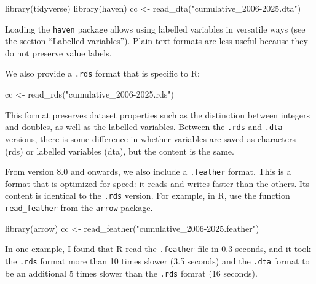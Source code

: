 \documentclass[10pt,article,oneside]{memoir}
\newenvironment{Shaded}{\begin{snugshade}}{\end{snugshade}}
\newcommand{\FunctionTok}[1]{\textcolor[rgb]{0.28,0.35,0.67}{#1}}
\newcommand{\NormalTok}[1]{\textcolor[rgb]{0.00,0.23,0.31}{#1}}
\newcommand{\OtherTok}[1]{\textcolor[rgb]{0.00,0.23,0.31}{#1}}
\newcommand{\StringTok}[1]{\textcolor[rgb]{0.13,0.47,0.30}{#1}}
\begin{document}
\begin{Shaded}
\begin{Highlighting}[]
\FunctionTok{library}\NormalTok{(tidyverse)}
\FunctionTok{library}\NormalTok{(haven)}
\NormalTok{cc }\OtherTok{\textless{}{-}} \FunctionTok{read\_dta}\NormalTok{(}\StringTok{"cumulative\_2006{-}2025.dta"}\NormalTok{)}
\end{Highlighting}
\end{Shaded}

Loading the \texttt{haven} package allows using labelled variables in
versatile ways (see the section ``Labelled variables''). Plain-text
formats are less useful because they do not preserve value labels.

We also provide a \texttt{.rds} format that is specific to R:

\begin{Shaded}
\begin{Highlighting}[]
\NormalTok{cc }\OtherTok{\textless{}{-}} \FunctionTok{read\_rds}\NormalTok{(}\StringTok{"cumulative\_2006{-}2025.rds"}\NormalTok{)}
\end{Highlighting}
\end{Shaded}

This format preserves dataset properties such as the distinction between
integers and doubles, as well as the labelled variables. Between the
\texttt{.rds} and \texttt{.dta} versions, there is some difference in
whether variables are saved as characters (rds) or labelled variables
(dta), but the content is the same.

From version 8.0 and onwards, we also include a \texttt{.feather}
format. This is a format that is optimized for speed: it reads and
writes faster than the others. Its content is identical to the
\texttt{.rds} version. For example, in R, use the function
\texttt{read\_feather} from the \texttt{arrow} package.

\begin{Shaded}
\begin{Highlighting}[]
\FunctionTok{library}\NormalTok{(arrow)}
\NormalTok{cc }\OtherTok{\textless{}{-}} \FunctionTok{read\_feather}\NormalTok{(}\StringTok{"cumulative\_2006{-}2025.feather"}\NormalTok{)}
\end{Highlighting}
\end{Shaded}

In one example, I found that R read the \texttt{.feather} file in 0.3
seconds, and it took the \texttt{.rds} format more than 10 times slower
(3.5 seconds) and the \texttt{.dta} format to be an additional 5 times
slower than the \texttt{.rds} fomrat (16 seconds).
\end{document}
